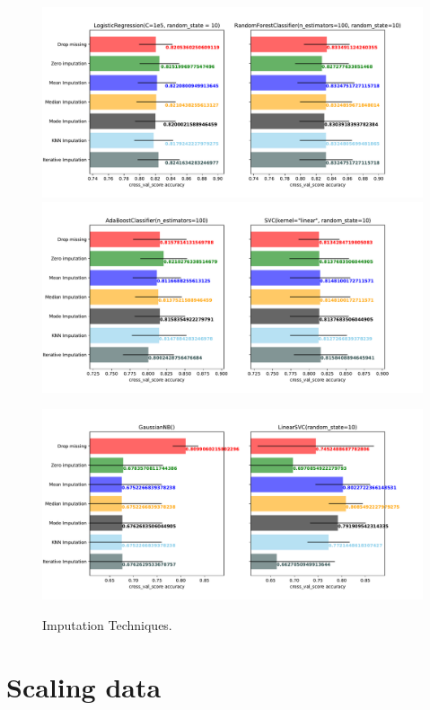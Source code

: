 \documentclass[12pt,twoside]{report}
\begin{document}
\begin{figure}[ht!p]
\caption{Imputation Techniques.}
\includegraphics[width=\textwidth]{./code/figures_python/imputation_techniques/imputation_techniques_lr_rfc.pdf}%

\includegraphics[width=\textwidth]{./code/figures_python/imputation_techniques/imputation_techniques_ab_svc.pdf}%

\includegraphics[width=\textwidth]{./code/figures_python/imputation_techniques/imputation_techniques_gnb_svc_linear.pdf}%
\label{imputation}
\end{figure}

\section*{Scaling data}
\end{document}
